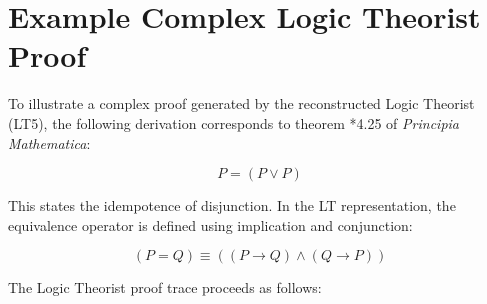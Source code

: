 \documentclass[journal]{IEEEtran}
\begin{document}
\appendix

\section{Example Complex Logic Theorist Proof}

To illustrate a complex proof generated by the reconstructed Logic
Theorist (LT5), the following derivation corresponds to theorem *4.25
of \textit{Principia Mathematica}:

\[ P = (P \lor P) \]

This states the idempotence of disjunction. In the LT representation,
the equivalence operator is defined using implication and conjunction:

\[ (P = Q) \equiv ((P \rightarrow Q) \land (Q \rightarrow P)) \]

The Logic Theorist proof trace proceeds as follows:
\end{document}
